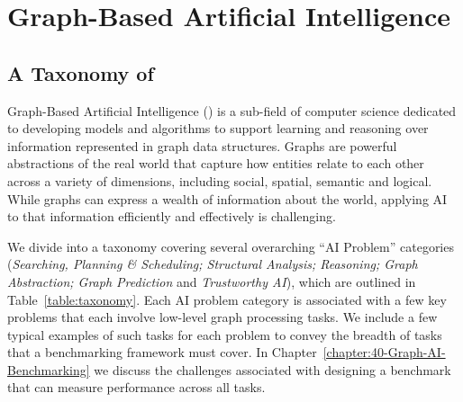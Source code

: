 \section{Graph-Based Artificial Intelligence}
\label{section:11-graph-based-ai}

\subsection{A Taxonomy of \gai}
Graph-Based Artificial Intelligence (\gai) is a sub-field of computer science dedicated to developing models and algorithms to support learning and reasoning over information represented in graph data structures.
Graphs are powerful abstractions of the real world that capture how entities relate to each other across a variety of dimensions, including social, spatial, semantic and logical. 
While graphs can express a wealth of information about the world, applying AI to that information efficiently and effectively is challenging.



We divide \gai into a taxonomy covering several overarching ``AI Problem'' categories (\textit{Searching, Planning \& Scheduling; Structural Analysis; Reasoning; Graph Abstraction; Graph Prediction} and \textit{Trustworthy AI}), which are outlined in Table~\ref{table:taxonomy}. 
Each AI problem category is associated with a few key \gai problems that each involve low-level graph processing tasks.
We include a few typical examples of such tasks for each \gai problem to convey the breadth of tasks that a \gai benchmarking framework must cover.
In Chapter~\ref{chapter:40-Graph-AI-Benchmarking} we discuss the challenges associated with designing a benchmark that can measure performance across all \gai tasks.





